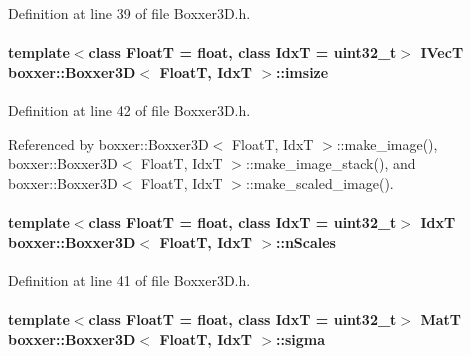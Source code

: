 Definition at line 39 of file Boxxer3\+D.\+h.

\paragraph[{\texorpdfstring{imsize}{imsize}}]{\setlength{\rightskip}{0pt plus 5cm}template$<$class FloatT  = float, class IdxT  = uint32\+\_\+t$>$ {\bf I\+VecT} {\bf boxxer\+::\+Boxxer3D}$<$ FloatT, IdxT $>$\+::imsize}\hypertarget{classboxxer_1_1Boxxer3D_a236f3f4ada01376204e59f9f68d5fde6}{}\label{classboxxer_1_1Boxxer3D_a236f3f4ada01376204e59f9f68d5fde6}


Definition at line 42 of file Boxxer3\+D.\+h.



Referenced by boxxer\+::\+Boxxer3\+D$<$ Float\+T, Idx\+T $>$\+::make\+\_\+image(), boxxer\+::\+Boxxer3\+D$<$ Float\+T, Idx\+T $>$\+::make\+\_\+image\+\_\+stack(), and boxxer\+::\+Boxxer3\+D$<$ Float\+T, Idx\+T $>$\+::make\+\_\+scaled\+\_\+image().

\paragraph[{\texorpdfstring{n\+Scales}{nScales}}]{\setlength{\rightskip}{0pt plus 5cm}template$<$class FloatT  = float, class IdxT  = uint32\+\_\+t$>$ IdxT {\bf boxxer\+::\+Boxxer3D}$<$ FloatT, IdxT $>$\+::n\+Scales}\hypertarget{classboxxer_1_1Boxxer3D_a344ef289cd330d4353c4605f2c2e2bbc}{}\label{classboxxer_1_1Boxxer3D_a344ef289cd330d4353c4605f2c2e2bbc}


Definition at line 41 of file Boxxer3\+D.\+h.

\paragraph[{\texorpdfstring{sigma}{sigma}}]{\setlength{\rightskip}{0pt plus 5cm}template$<$class FloatT  = float, class IdxT  = uint32\+\_\+t$>$ {\bf MatT} {\bf boxxer\+::\+Boxxer3D}$<$ FloatT, IdxT $>$\+::sigma}\hypertarget{classboxxer_1_1Boxxer3D_a5df6b670e57ee7b6c2396650f6caba86}{}\label{classboxxer_1_1Boxxer3D_a5df6b670e57ee7b6c2396650f6caba86}


